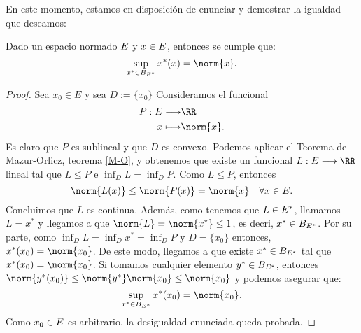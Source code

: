 En este momento, estamos en disposición de enunciar y demostrar la igualdad que deseamos:
\begin{proposicionBox}
	Dado un espacio normado $ E $ y $ x \in E $, entonces se cumple que:
	\begin{equation}\label{iguNorm}
	\sup_{x^* \in B_{\normSpace ^ *}} x^*(x) = \norm{x}.
	\end{equation}
\end{proposicionBox}
\begin{proof}
Sea $ x_0 \in E$ y sea $ D := \{x_0\} $ Consideramos el funcional 
\begin{equation*}
\begin{split}
P:\normSpace \longrightarrow &\RR \\
x \longmapsto &\norm{x}.
\end{split}
\end{equation*} 
Es claro que $ P $ es sublineal y que $ D $ es convexo. Podemos aplicar el Teorema de Mazur-Orlicz, teorema \ref{M-O}, y obtenemos que existe un funcional $ L:\normSpace \longrightarrow \RR $ lineal tal que $ L \leq P $ e $ \inf_D L = \inf_D P $. Como $ L \leq P $, entonces 
\begin{equation*}
 	\norm{L(x)} \leq \norm{P(x)} = \norm{x} \quad \forall x \in \normSpace.
\end{equation*}
Concluimos que $ L $ es continua. Además, como tenemos que $ L \in E ^* $, llamamos $ L = x^* $ y llegamos a que $ \norm{L} = \norm{x^*}  \leq 1$, es decri, $ x^* \in  B_{E ^ *} $.  Por su parte, como  $ \inf_D L = \inf_D x^* = \inf_D P $ y $ D = \{x_0\} $ entonces, $ x^*(x_0) = \norm{x_0} $. De este modo, llegamos a que existe $ x^* \in B_{E^*} $ tal que $ x^*(x_0) = \norm{x_0} $. Si tomamos cualquier elemento $ y^* \in B_{E^*}  $, entonces $ \norm{y^*(x_0)} \leq \norm{y^*} \norm{x_0} \leq \norm{x_0} $ y podemos asegurar que:
\[
\sup_{x^* \in B_{\normSpace ^ *}} x^*(x_0) = \norm{x_0}.
\] 
Como $ x_0 \in E $ es arbitrario, la desigualdad enunciada queda probada.
\end{proof}